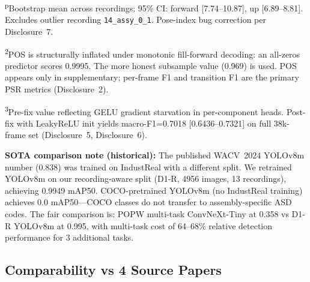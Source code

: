 \documentclass[conference]{IEEEtran}
\begin{document}
\begin{table}[htbp]
\noindent\textsuperscript{p}Bootstrap mean across recordings; 95\% CI: forward [7.74--10.87], up [6.89--8.81]. Excludes outlier recording \texttt{14\_assy\_0\_1}. Pose-index bug correction per Disclosure~7.

\noindent\textsuperscript{2}POS is structurally inflated under monotonic fill-forward decoding: an all-zeros predictor scores 0.9995. The more honest subsample value (0.969) is used. POS appears only in supplementary; per-frame F1 and transition F1 are the primary PSR metrics (Disclosure~2).

\noindent\textsuperscript{3}Pre-fix value reflecting GELU gradient starvation in per-component heads. Post-fix with LeakyReLU init yields macro-F1=0.7018 [0.6436--0.7321] on full 38k-frame set (Disclosure~5, Disclosure~6).\end{table}

\textbf{SOTA comparison note (historical):} The published WACV~2024 YOLOv8m number (0.838) was trained on IndustReal with a different split. We retrained YOLOv8m on our recording-aware split (D1-R, 4956 images, 13 recordings), achieving 0.9949 mAP50. COCO-pretrained YOLOv8m (no IndustReal training) achieves 0.0 mAP50---COCO classes do not transfer to assembly-specific ASD codes. The fair comparison is: POPW multi-task ConvNeXt-Tiny at 0.358 vs D1-R YOLOv8m at 0.995, with multi-task cost of 64--68\% relative detection performance for 3 additional tasks.

\subsection{Comparability vs 4 Source Papers}
\end{document}
